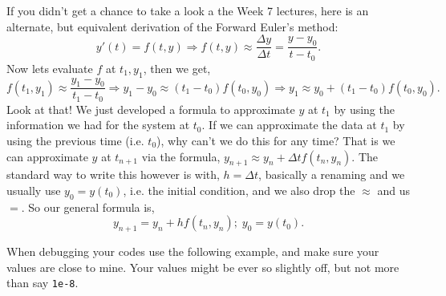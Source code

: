 \documentclass[reqno]{amsart}
\theoremstyle{definition}
\begin{document}
\bigskip
\bigskip
\bigskip
\bigskip

If you didn't get a chance to take a look a the Week 7 lectures, here is an alternate, but equivalent derivation of the Forward Euler's method:
%
\begin{equation*}
y'(t) = f(t,y) \Rightarrow f(t,y) \approx \frac{\Delta y}{\Delta t} = \frac{y-y_0}{t-t_0}.
\end{equation*}
%
Now lets evaluate $f$ at $t_1,y_1$, then we get,
%
\begin{equation*}
f(t_1,y_1) \approx \frac{y_1 - y_0}{t_1 - t_0} \Rightarrow y_1 - y_0 \approx (t_1 - t_0)f(t_0,y_0)
\Rightarrow y_1 \approx y_0 + (t_1-t_0)f(t_0,y_0).
\end{equation*}
%
Look at that!  We just developed a formula to approximate $y$ at $t_1$
by using the information we had for the system at $t_0$.  If we can approximate
the data at $t_1$ by using the previous time (i.e. $t_0$), why can't we do this
for any time?  That is we can approximate $y$ at $t_{n+1}$ via the formula,
$y_{n+1} \approx y_n + \Delta tf(t_n,y_n)$.  The standard way to write
this however is with, $h = \Delta t$, basically a renaming and we
usually use $y_0 = y(t_0)$, i.e. the initial condition, and we also drop the
$\approx$ and us $=$.  So our general formula is,
%
\begin{equation}
y_{n+1} = y_n + hf(t_n,y_n);\; y_0 = y(t_0).
\end{equation}
%

\pagebreak

When debugging your codes use the following example, and make sure your values
are close to mine.  Your values might be ever so slightly off, but not more
than say \verb|1e-8|.
\end{document}
